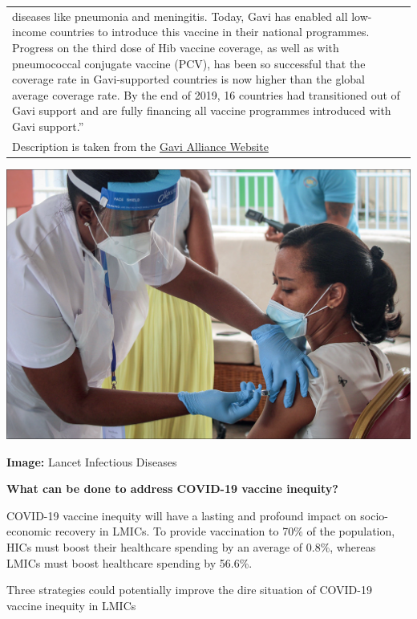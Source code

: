 \documentclass[
  11pt,
  paper=a4,
  ,captions=tableheading
]{scrartcl}
\begin{document}
\begin{longtable}[]{@{}
  >{\raggedright\arraybackslash}p{}@{}}
diseases like pneumonia and meningitis. Today, Gavi has enabled all
low-income countries to introduce this vaccine in their national
programmes. Progress on the third dose of Hib vaccine coverage, as well
as with pneumococcal conjugate vaccine (PCV), has been so successful
that the coverage rate in Gavi-supported countries is now higher than
the global average coverage rate. By the end of 2019, 16 countries had
transitioned out of Gavi support and are fully financing all vaccine
programmes introduced with Gavi support.'' \\
Description is taken from the
\href{https://www.gavi.org/our-alliance/about}{Gavi Alliance Website} \\
\bottomrule
\end{longtable}

\includegraphics[width=6.25in,height=\textheight]{images/LMIC_vaccination.jpg}

\textbf{Image:} Lancet Infectious Diseases

\textbf{What can be done to address COVID-19 vaccine inequity?}

COVID-19 vaccine inequity will have a lasting and profound impact on
socio-economic recovery in LMICs. To provide vaccination to 70\% of the
population, HICs must boost their healthcare spending by an average of
0.8\%, whereas LMICs must boost healthcare spending by 56.6\%.

Three strategies could potentially improve the dire situation of
COVID-19 vaccine inequity in LMICs\\
\end{document}
